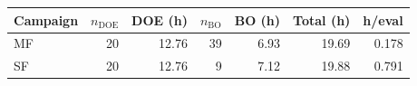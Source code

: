 \begin{tabular}{lrrrrrr}
\hline
Campaign & $n_{\mathrm{DOE}}$ & DOE (h) & $n_{\mathrm{BO}}$ & BO (h) & Total (h) & h/eval \\
\hline
MF & 20 & 12.76 & 39 & 6.93 & 19.69 & 0.178 \\
SF & 20 & 12.76 & 9 & 7.12 & 19.88 & 0.791 \\
\hline
\end{tabular}
